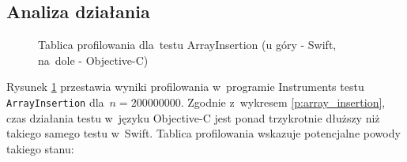 \documentclass[mgr, shortabstract]{iithesis}
\begin{document}
\subsection{Analiza działania}

\begin{figure}
    \caption{Tablica profilowania dla~testu ArrayInsertion (u góry - Swift, na~dole - Objective-C)}
    \label{i:array_insertion}
\end{figure}

Rysunek \ref{i:array_insertion} przestawia wyniki profilowania w~programie Instruments testu \texttt{ArrayInsertion} dla~$n = 200000000$. Zgodnie z~wykresem \ref{p:array_insertion}, czas działania testu w~języku Objective-C jest ponad trzykrotnie dłuższy niż takiego samego testu w~Swift. Tablica profilowania wskazuje potencjalne powody takiego stanu:
\end{document}
